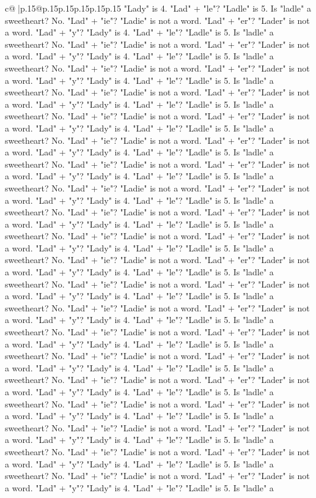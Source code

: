 \documentclass{article}
\begin{document}
{\begin{supertabular}{c@{$\;$}|p{.15\linewidth}@{}p{.15\linewidth}p{.15\linewidth}p{.15\linewidth}p{.15\linewidth}p{.15\linewidth}}
{{{"Lady" is 4. "Lad" + "le"? "Ladle" is 5. Is "ladle" a sweetheart? No. "Lad" + "ie"? "Ladie" is not a word. "Lad" + "er"? "Lader" is not a word. "Lad" + "y"? "Lady" is 4. "Lad" + "le"? "Ladle" is 5. Is "ladle" a sweetheart? No. "Lad" + "ie"? "Ladie" is not a word. "Lad" + "er"? "Lader" is not a word. "Lad" + "y"? "Lady" is 4. "Lad" + "le"? "Ladle" is 5. Is "ladle" a sweetheart? No. "Lad" + "ie"? "Ladie" is not a word. "Lad" + "er"? "Lader" is not a word. "Lad" + "y"? "Lady" is 4. "Lad" + "le"? "Ladle" is 5. Is "ladle" a sweetheart? No. "Lad" + "ie"? "Ladie" is not a word. "Lad" + "er"? "Lader" is not a word. "Lad" + "y"? "Lady" is 4. "Lad" + "le"? "Ladle" is 5. Is "ladle" a sweetheart? No. "Lad" + "ie"? "Ladie" is not a word. "Lad" + "er"? "Lader" is not a word. "Lad" + "y"? "Lady" is 4. "Lad" + "le"? "Ladle" is 5. Is "ladle" a sweetheart? No. "Lad" + "ie"? "Ladie" is not a word. "Lad" + "er"? "Lader" is not a word. "Lad" + "y"? "Lady" is 4. "Lad" + "le"? "Ladle" is 5. Is "ladle" a sweetheart? No. "Lad" + "ie"? "Ladie" is not a word. "Lad" + "er"? "Lader" is not a word. "Lad" + "y"? "Lady" is 4. "Lad" + "le"? "Ladle" is 5. Is "ladle" a sweetheart? No. "Lad" + "ie"? "Ladie" is not a word. "Lad" + "er"? "Lader" is not a word. "Lad" + "y"? "Lady" is 4. "Lad" + "le"? "Ladle" is 5. Is "ladle" a sweetheart? No. "Lad" + "ie"? "Ladie" is not a word. "Lad" + "er"? "Lader" is not a word. "Lad" + "y"? "Lady" is 4. "Lad" + "le"? "Ladle" is 5. Is "ladle" a sweetheart? No. "Lad" + "ie"? "Ladie" is not a word. "Lad" + "er"? "Lader" is not a word. "Lad" + "y"? "Lady" is 4. "Lad" + "le"? "Ladle" is 5. Is "ladle" a sweetheart? No. "Lad" + "ie"? "Ladie" is not a word. "Lad" + "er"? "Lader" is not a word. "Lad" + "y"? "Lady" is 4. "Lad" + "le"? "Ladle" is 5. Is "ladle" a sweetheart? No. "Lad" + "ie"? "Ladie" is not a word. "Lad" + "er"? "Lader" is not a word. "Lad" + "y"? "Lady" is 4. "Lad" + "le"? "Ladle" is 5. Is "ladle" a sweetheart? No. "Lad" + "ie"? "Ladie" is not a word. "Lad" + "er"? "Lader" is not a word. "Lad" + "y"? "Lady" is 4. "Lad" + "le"? "Ladle" is 5. Is "ladle" a sweetheart? No. "Lad" + "ie"? "Ladie" is not a word. "Lad" + "er"? "Lader" is not a word. "Lad" + "y"? "Lady" is 4. "Lad" + "le"? "Ladle" is 5. Is "ladle" a sweetheart? No. "Lad" + "ie"? "Ladie" is not a word. "Lad" + "er"? "Lader" is not a word. "Lad" + "y"? "Lady" is 4. "Lad" + "le"? "Ladle" is 5. Is "ladle" a sweetheart? No. "Lad" + "ie"? "Ladie" is not a word. "Lad" + "er"? "Lader" is not a word. "Lad" + "y"? "Lady" is 4. "Lad" + "le"? "Ladle" is 5. Is "ladle" a sweetheart? No. "Lad" + "ie"? "Ladie" is not a word. "Lad" + "er"? "Lader" is not a word. "Lad" + "y"? "Lady" is 4. "Lad" + "le"? "Ladle" is 5. Is "ladle" a sweetheart? No. "Lad" + "ie"? "Ladie" is not a word. "Lad" + "er"? "Lader" is not a word. "Lad" + "y"? "Lady" is 4. "Lad" + "le"? "Ladle" is 5. Is "ladle" a sweetheart? No. "Lad" + "ie"? "Ladie" is not a word. "Lad" + "er"? "Lader" is not a word. "Lad" + "y"? "Lady" is 4. "Lad" + "le"? "Ladle" is 5. Is "ladle" a sweetheart? No. "Lad" + "ie"? "Ladie" is not a word. "Lad" + "er"? "Lader" is not a word. "Lad" + "y"? "Lady" is 4. "Lad" + "le"? "Ladle" is 5. Is "ladle" a }}}
\end{supertabular}}
\end{document}
